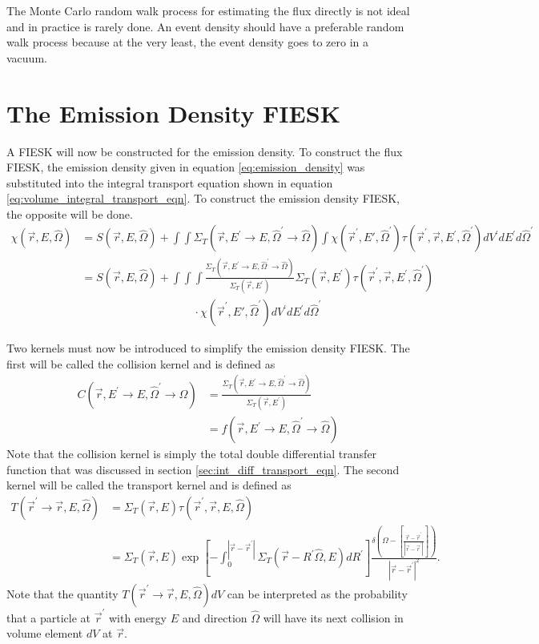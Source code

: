The Monte Carlo random walk process for estimating the flux directly is not 
ideal and in practice is rarely done. An event density should have a preferable 
random walk process because at the very least, the event density goes to zero 
in a vacuum. 

\section{The Emission Density FIESK}
A FIESK will now be constructed for the emission density. To construct the
flux FIESK, the emission density given in equation \ref{eq:emission_density} was
substituted into the integral transport equation shown in equation 
\ref{eq:volume_integral_transport_eqn}. To construct the emission density FIESK,
the opposite will be done. 
\begin{align}
    \chi(\vec{r},E,\hat{\Omega}) & = S(\vec{r},E,\hat{\Omega}) +
    \int\int \Sigma_T(\vec{r},E^{'} \to E, \hat{\Omega}^{'} \to \hat{\Omega})
    \int \chi(\vec{r}^{'},E',\hat{\Omega}^{'})
    \tau(\vec{r}^{'},\vec{r},E^{'},\hat{\Omega}^{'})dV^{'}dE^{'}d\hat{\Omega}^{'} 
    \nonumber \\
    & = S(\vec{r},E,\hat{\Omega}) + \int\int\int
    \frac{\Sigma_T(\vec{r},E^{'} \to E, \hat{\Omega}^{'} \to \hat{\Omega})}
    {\Sigma_T(\vec{r},E^{'})} \Sigma_T(\vec{r},E^{'}) 
    \tau(\vec{r}^{'},\vec{r},E^{'},\hat{\Omega}^{'}) \nonumber \\
    & \qquad \qquad \qquad \qquad \qquad \cdot 
    \chi(\vec{r}^{'},E',\hat{\Omega}^{'}) dV^{'}dE^{'}d\hat{\Omega}^{'} \nonumber
\end{align}

Two kernels must now be introduced to simplify the emission density FIESK. The
first will be called the collision kernel and is defined as 
\begin{align}
  C(\vec{r},E^{'} \to E,\hat{\Omega}^{'} \to \hat{\Omega}) & = 
  \frac{\Sigma_T(\vec{r},E^{'} \to E,\hat{\Omega}^{'} \to \hat{\Omega})}
       {\Sigma_T(\vec{r},E^{'})} \nonumber \\
  & = f(\vec{r},E^{'} \to E,\hat{\Omega}^{'} \to \hat{\Omega})
\end{align}
Note that the collision kernel is simply the total double differential transfer 
function that was discussed in section \ref{sec:int_diff_transport_eqn}.
The second kernel will be called the transport kernel and is defined as
\begin{align}
  T(\vec{r}^{'} \to \vec{r},E,\hat{\Omega}) & = \Sigma_T(\vec{r},E)
  \tau(\vec{r}^{'},\vec{r},E,\hat{\Omega}) \nonumber \\
  & = \Sigma_T(\vec{r},E)
  \exp{\left[-\int_0^{|\vec{r} - \vec{r}^{'}|} 
    \Sigma_T(\vec{r}-R^{'}\hat{\Omega},E)dR^{'} \right]} 
  \frac{\delta \left(\Omega - \left[\frac{\vec{r} - \vec{r}^{'}}
      {|\vec{r} - \vec{r}^{'}|}\right]\right)}
       {|\vec{r} - \vec{r}^{'}|^2}.
  \label{eq:transport_kernel}
\end{align}
Note that the quantity $T(\vec{r}^{'} \to \vec{r},E,\hat{\Omega})dV$ can be 
interpreted as the probability that a particle at $\vec{r}^{'}$ with energy $E$ 
and direction $\hat{\Omega}$ will have its next collision in volume element $dV$
at $\vec{r}$.
 
